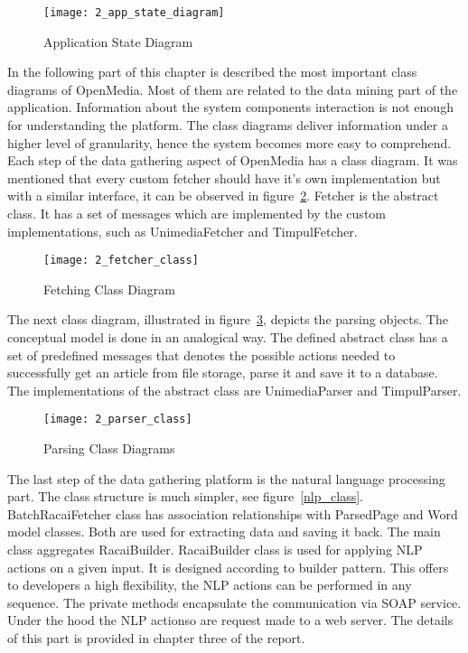 \begin{figure}[!ht]
\centering
\texttt{[image: 2\_app\_state\_diagram]}
\caption{Application State Diagram}\label{app_state_diagram}
\end{figure}

In the following part of this chapter is described the most important class diagrams of \mbox{OpenMedia}. Most of them are related to the data mining part of the application. Information about the system components interaction is not enough for understanding the platform. The class diagrams deliver information under a higher level of granularity, hence the system becomes more easy to comprehend. Each step of the data gathering aspect of OpenMedia has a class diagram. It was mentioned that every custom fetcher should have it's own implementation but with a similar interface, it can be observed in \mbox{figure \ref{fetcher_class}}. Fetcher is the abstract class. It has a set of messages which are implemented by the custom implementations, such as UnimediaFetcher and TimpulFetcher.

\begin{figure}[!ht]
\centering
\vspace*{0.6cm}
\texttt{[image: 2\_fetcher\_class]}
\caption{Fetching Class Diagram}\label{fetcher_class}
\end{figure}

The next class diagram, illustrated in \mbox{figure \ref{parser_class}}, depicts the parsing objects. The conceptual model is done in an analogical way. The defined abstract class has a set of predefined messages that denotes the possible actions needed to successfully get an article from file storage, parse it and save it to a database. The implementations of the abstract class are UnimediaParser and TimpulParser.

\begin{figure}[!h]
\centering
\texttt{[image: 2\_parser\_class]}
\caption{Parsing Class Diagrams}\label{parser_class}
\end{figure}

The last step of the data gathering platform is the natural language processing part. The class structure is much simpler, see \mbox{figure \ref{nlp_class}}. BatchRacaiFetcher class has association relationships with ParsedPage and Word model classes. Both are used for extracting data and saving it back. The main class aggregates RacaiBuilder. RacaiBuilder class is used for applying NLP actions on a given input. It is designed according to builder pattern. This offers to developers a high flexibility, the NLP actions can be performed in any sequence. The private methods encapsulate the communication via SOAP service. Under the hood the NLP actionso are request made to a web server. The details of this part is provided in chapter three of the report.

